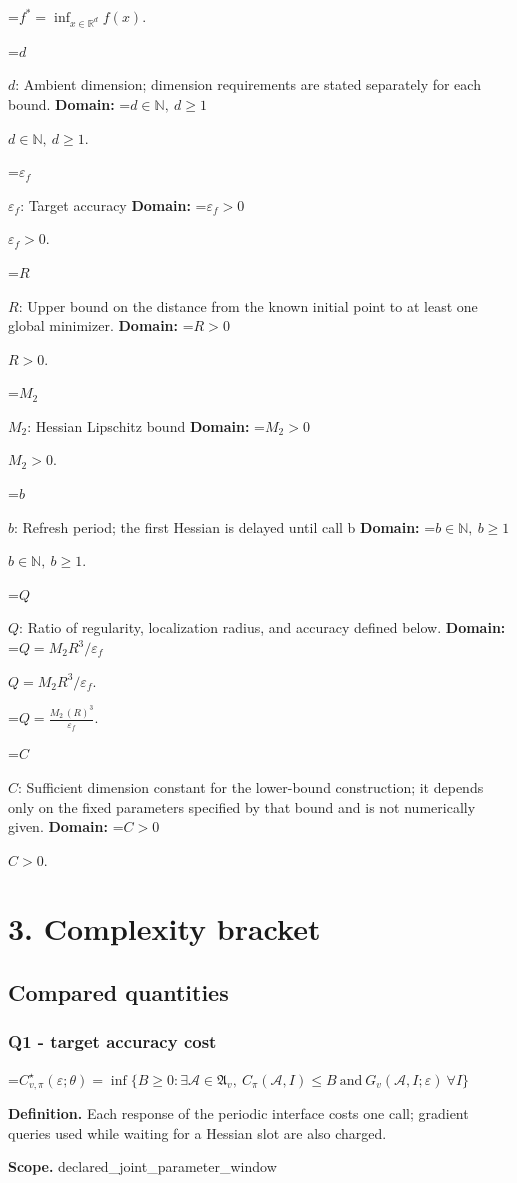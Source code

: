 \documentclass[10pt,a4paper]{article}
\newcommand{\AtlasMath}[1]{\par\begingroup\centering\setbox0=\hbox{$\displaystyle #1$}\ifdim\wd0>1.4\linewidth\typeout{ATLAS WIDE FORMULA: \the\wd0}\fi\ifdim\wd0>\linewidth\resizebox{\linewidth}{!}{\box0}\else\box0\fi\par\endgroup}
\newcommand{\AtlasInlineMath}[1]{\begingroup\setbox0=\hbox{$#1$}\ifdim\wd0>.4\linewidth\endgroup\AtlasMath{#1}\else\endgroup$#1$\fi}
\begin{document}
\AtlasMath{f^*=\inf_{x\in \mathbb{R}^d}f(x).}


\AtlasInlineMath{d}: Ambient dimension; dimension requirements are stated separately for each bound. \textbf{Domain:} \AtlasInlineMath{d\in\mathbb{N},\ d\ge1}.

\AtlasInlineMath{\varepsilon_f}: Target accuracy \textbf{Domain:} \AtlasInlineMath{\varepsilon_f>0}.

\AtlasInlineMath{R}: Upper bound on the distance from the known initial point to at least one global minimizer. \textbf{Domain:} \AtlasInlineMath{R>0}.

\AtlasInlineMath{M_2}: Hessian Lipschitz bound \textbf{Domain:} \AtlasInlineMath{M_2>0}.

\AtlasInlineMath{b}: Refresh period; the first Hessian is delayed until call b \textbf{Domain:} \AtlasInlineMath{b\in\mathbb{N},\ b\ge1}.

\AtlasInlineMath{Q}: Ratio of regularity, localization radius, and accuracy defined below. \textbf{Domain:} \AtlasInlineMath{Q=M_2R^3/\varepsilon_f}.


\AtlasMath{Q=\frac{M_2\,(R)^{3}}{\varepsilon_f}.}


\AtlasInlineMath{C}: Sufficient dimension constant for the lower-bound construction; it depends only on the fixed parameters specified by that bound and is not numerically given. \textbf{Domain:} \AtlasInlineMath{C>0}.

\section{3. Complexity bracket}
\subsection{Compared quantities}
\subsubsection{Q1 - target accuracy cost}
\AtlasMath{C^\star_{v,\pi}(\varepsilon;\theta)=\inf\{B\ge0:\exists\mathcal A\in\mathfrak A_v,\ C_\pi(\mathcal A,I)\le B\ \text{and}\ G_v(\mathcal A,I;\varepsilon)\ \forall I\}}
\textbf{Definition.} Each response of the periodic interface costs one call; gradient queries used while waiting for a Hessian slot are also charged.

\textbf{Scope.} declared\_joint\_parameter\_window
\end{document}
